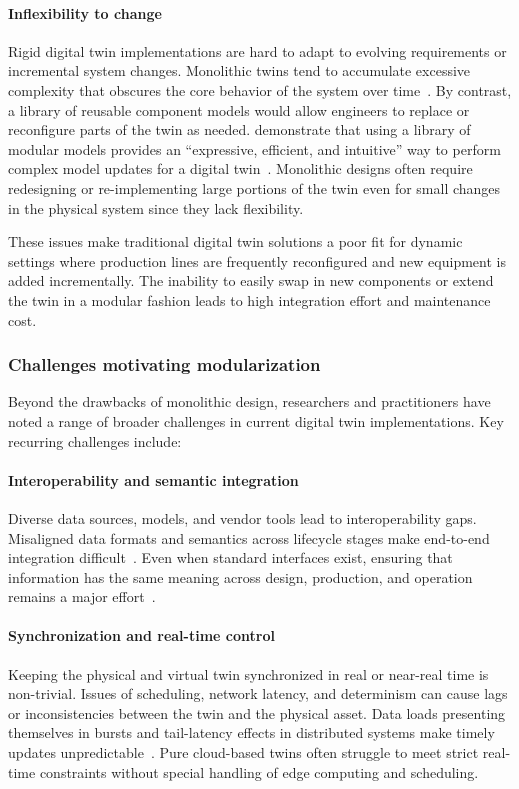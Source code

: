 \paragraph{Inflexibility to change} Rigid digital twin implementations are hard to adapt to evolving requirements or incremental system changes. Monolithic twins tend to accumulate excessive complexity that obscures the core behavior of the system over time~\cite{Visser2024}. By contrast, a library of reusable component models would allow engineers to replace or reconfigure parts of the twin as needed. \citeauthor{Kapteyn2020} demonstrate that using a library of modular models provides an “expressive, efficient, and intuitive” way to perform complex model updates for a digital twin~\cite{Kapteyn2020}. Monolithic designs often require redesigning or re-implementing large portions of the twin even for small changes in the physical system since they lack flexibility.



These issues make traditional digital twin solutions a poor fit for dynamic settings where production lines are frequently reconfigured and new equipment is added incrementally. The inability to easily swap in new components or extend the twin in a modular fashion leads to high integration effort and maintenance cost.

\subsubsection{Challenges motivating modularization}
Beyond the drawbacks of monolithic design, researchers and practitioners have noted a range of broader challenges in current digital twin implementations. Key recurring challenges include:


\paragraph{Interoperability and semantic integration} Diverse data sources, models, and vendor tools lead to interoperability gaps. Misaligned data formats and semantics across lifecycle stages make end-to-end integration difficult~\cite{jones2020characterising, kritzinger2018digital, Pretel2024SLR, Liu2024DTMMReview}. Even when standard interfaces exist, ensuring that information has the same meaning across design, production, and operation remains a major effort~\cite{Human2023}.



\paragraph{Synchronization and real-time control} Keeping the physical and virtual twin synchronized in real or near-real time is non-trivial. Issues of scheduling, network latency, and determinism can cause lags or inconsistencies between the twin and the physical asset. Data loads presenting themselves in bursts and tail-latency effects in distributed systems make timely updates unpredictable~\cite{tan2024dtsync, DeanBarroso2013TailAtScale}. Pure cloud-based twins often struggle to meet strict real-time constraints without special handling of edge computing and scheduling.


